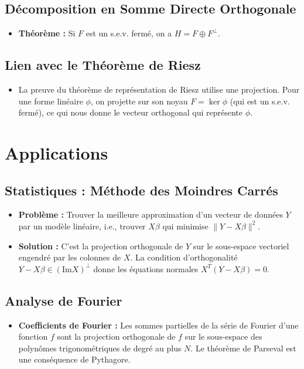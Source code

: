 \documentclass[12pt, a4paper, parskip=full]{report}
\theoremstyle{agregstyle}
\begin{document}
\subsection{Décomposition en Somme Directe Orthogonale}
\begin{itemize}
    \item \textbf{Théorème :} Si $F$ est un s.e.v. fermé, on a $H = F \oplus F^\perp$.
\end{itemize}
\subsection{Lien avec le Théorème de Riesz}
\begin{itemize}
    \item La preuve du théorème de représentation de Riesz utilise une projection. Pour une forme linéaire $\phi$, on projette sur son noyau $F = \ker \phi$ (qui est un s.e.v. fermé), ce qui nous donne le vecteur orthogonal qui représente $\phi$.
\end{itemize}

\section{Applications}
\subsection{Statistiques : Méthode des Moindres Carrés}
\begin{itemize}
    \item \textbf{Problème :} Trouver la meilleure approximation d'un vecteur de données $Y$ par un modèle linéaire, i.e., trouver $X\beta$ qui minimise $\|Y-X\beta\|^2$.
    \item \textbf{Solution :} C'est la projection orthogonale de $Y$ sur le sous-espace vectoriel engendré par les colonnes de $X$. La condition d'orthogonalité $Y - X\beta \in (\mathrm{Im} X)^\perp$ donne les équations normales $X^T(Y-X\beta)=0$.
\end{itemize}
\subsection{Analyse de Fourier}
\begin{itemize}
    \item \textbf{Coefficients de Fourier :} Les sommes partielles de la série de Fourier d'une fonction $f$ sont la projection orthogonale de $f$ sur le sous-espace des polynômes trigonométriques de degré au plus $N$. Le théorème de Parseval est une conséquence de Pythagore.
\end{itemize}
\end{document}
